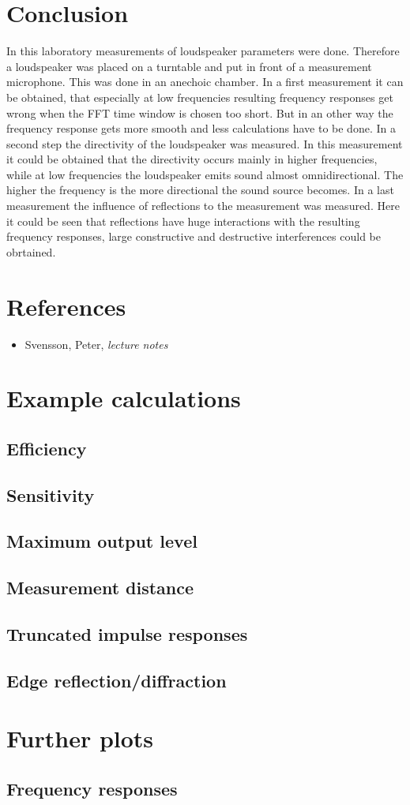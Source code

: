 \documentclass{article}
\begin{document}
\section{Conclusion}
In this laboratory measurements of loudspeaker parameters were done. Therefore a loudspeaker was placed on a turntable and put in front of a measurement microphone. This was done in an anechoic chamber. In a first measurement it can be obtained, that especially at low frequencies resulting frequency responses get wrong when the FFT time window is chosen too short. But in an other way the frequency response gets more smooth and less calculations have to be done. In a second step the directivity of the loudspeaker was measured. In this measurement it could be obtained that the directivity occurs mainly in higher frequencies, while at low frequencies the loudspeaker emits sound almost omnidirectional. The higher the frequency is the more directional the sound source becomes. In a last measurement the influence of reflections to the measurement was measured. Here it could be seen that reflections have huge interactions with the resulting frequency responses, large constructive and destructive interferences could be obrtained.

\newpage
\section*{References}
\footnotesize{
\begin{itemize}
\item Svensson, Peter, \textit{lecture notes}
\end{itemize}
}

\newpage
\appendix
\section{Example calculations}
\subsection{Efficiency}
\subsection{Sensitivity}
\subsection{Maximum output level}
\subsection{Measurement distance}
\subsection{Truncated impulse responses}
\subsection{Edge reflection/diffraction}


\section{Further plots}
\subsection{Frequency responses}
\end{document}
